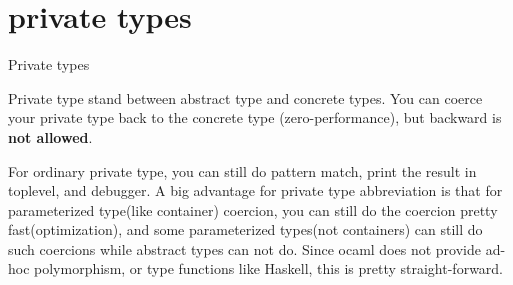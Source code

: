 \section{private types}
\label{sec:fancy-types-1}


Private types 

Private type stand between abstract type and concrete types. You can
coerce your private type back to the concrete type (zero-performance),
but backward is \textbf{not allowed}.

For ordinary private type, you can still do pattern match, print the
result in toplevel, and debugger. A big advantage for private type
abbreviation is that for parameterized type(like container) coercion,
you can still do the coercion pretty fast(optimization), and some
parameterized types(not containers) can still do such coercions while
abstract types can not do. Since ocaml does not provide ad-hoc
polymorphism, or type functions like Haskell, this is pretty
straight-forward.

\inputminted{ocaml}{./lang/code/priv.ml}

